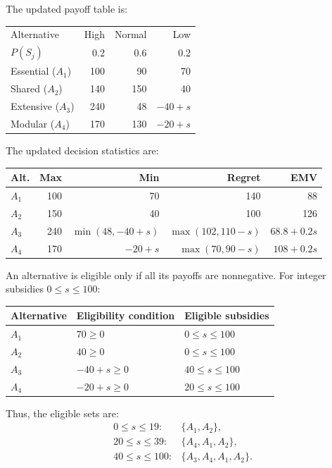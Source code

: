 The updated payoff table is:

\begin{center}\small\setlength{\tabcolsep}{4pt}
	\begin{tabular}{lrrr}\toprule
		Alternative & High & Normal & Low\\
		$P(S_j)$ & 0.2 & 0.6 & 0.2\\ \midrule
		Essential ($A_1$) & 100 & 90 & 70\\
		Shared ($A_2$) & 140 & 150 & 40\\
		Extensive ($A_3$) & 240 & 48 & $-40+s$\\
		Modular ($A_4$) & 170 & 130 & $-20+s$\\
		\bottomrule
	\end{tabular}
\end{center}

The updated decision statistics are:

\begin{center}\small\setlength{\tabcolsep}{4pt}
	\begin{tabular}{lrrrr}\toprule
		Alt. & Max & Min & Regret & EMV\\ \midrule
		$A_1$ & 100 & 70 & 140 & 88\\
		$A_2$ & 150 & 40 & 100 & 126\\
		$A_3$ & 240 & $\min(48,-40+s)$ & $\max(102,110-s)$ & $68.8+0.2s$\\
		$A_4$ & 170 & $-20+s$ & $\max(70,90-s)$ & $108+0.2s$\\
		\bottomrule
	\end{tabular}
\end{center}

An alternative is eligible only if all its payoffs are nonnegative.
For integer subsidies $0\le s\le100$:

\begin{center}
	\begin{tabular}{lll}\toprule
		Alternative & Eligibility condition & Eligible subsidies\\\midrule
		$A_1$ & $70\ge0$ & $0\le s\le100$\\
		$A_2$ & $40\ge0$ & $0\le s\le100$\\
		$A_3$ & $-40+s\ge0$ & $40\le s\le100$\\
		$A_4$ & $-20+s\ge0$ & $20\le s\le100$\\
		\bottomrule
	\end{tabular}
\end{center}

Thus, the eligible sets are:
\[
\begin{array}{ll}
	0\le s\le19: & \{A_1,A_2\},\\
	20\le s\le39: & \{A_4,A_1,A_2\},\\
	40\le s\le100: & \{A_3,A_4,A_1,A_2\}.
\end{array}
\]

